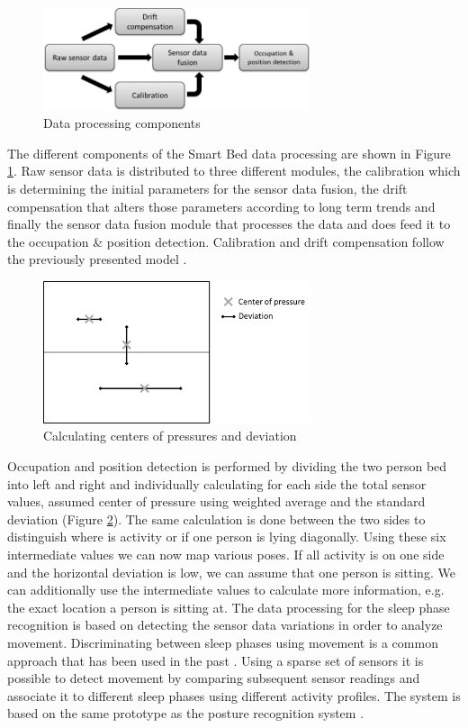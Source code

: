 \begin{figure}[h]
\centering
\includegraphics[width=0.7\textwidth]{images/smartbed_proc}
\caption{Data processing components \cite{braun2012context}}
\label{fig:smartbed_proc}
\end{figure}
The different components of the Smart Bed data processing are shown in Figure \ref{fig:smartbed_proc}. Raw sensor data is distributed to three different modules, the calibration which is determining the initial parameters for the sensor data fusion, the drift compensation that alters those parameters according to long term trends and finally the sensor data fusion module that processes the data and does feed it to the occupation \& position detection. Calibration and drift compensation follow the previously presented model \cite{braun2012context}. 
\begin{figure}[h]
\centering
\includegraphics[width=0.7\textwidth]{images/smartbed_cog}
\caption{Calculating centers of pressures and deviation \cite{braun2012context}}
\label{fig:smartbed_cog}
\end{figure}
Occupation and position detection is performed by dividing the two person bed into left and right and individually calculating for each side the total sensor values, assumed center of pressure using weighted average and the standard deviation (Figure \ref{fig:smartbed_cog}). The same calculation is done between the two sides to distinguish where is activity or if one person is lying diagonally.
Using these six intermediate values we can now map various poses. If all activity is on one side and the horizontal deviation is low, we can assume that one person is sitting. We can additionally use the intermediate values to calculate more information, e.g. the exact location a person is sitting at. 
The data processing for the sleep phase recognition is based on detecting the sensor data variations in order to analyze movement. Discriminating between sleep phases using movement is a common approach that has been used in the past \cite{salmi86}. Using a sparse set of sensors it is possible to detect movement by comparing subsequent sensor readings and associate it to different sleep phases using different activity profiles. The system is based on the same prototype as the posture recognition system \cite{Djakow2013movibed}.
